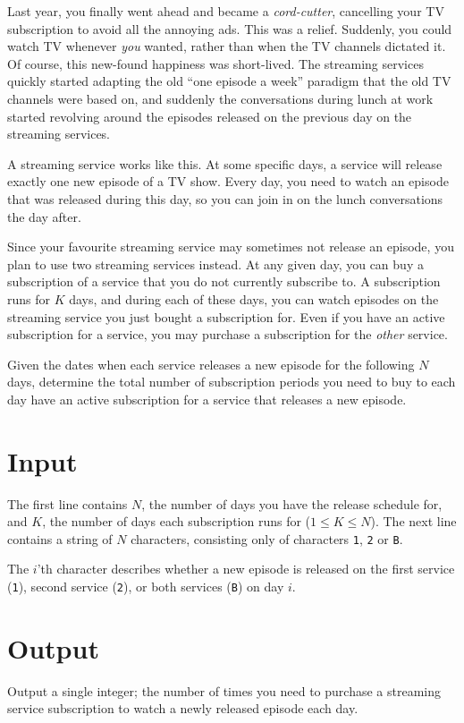 
Last year, you finally went ahead and became a \emph{cord-cutter}, cancelling your TV subscription to avoid all the annoying ads.
This was a relief.
Suddenly, you could watch TV whenever \emph{you} wanted, rather than when the TV channels dictated it.
Of course, this new-found happiness was short-lived.
The streaming services quickly started adapting the old ``one episode a week'' paradigm that the old TV channels were based on, and suddenly the conversations during lunch at work started revolving around the episodes released on the previous day on the streaming services.

A streaming service works like this.
At some specific days, a service will release exactly one new episode of a TV show.
Every day, you need to watch an episode that was released during this day, so you can join in on the lunch conversations the day after.

Since your favourite streaming service may sometimes not release an episode, you plan to use two streaming services instead.
At any given day, you can buy a subscription of a service that you do not currently subscribe to.
A subscription runs for $K$ days, and during each of these days, you can watch episodes on the streaming service you just bought a subscription for.
Even if you have an active subscription for a service, you may purchase a subscription for the \emph{other} service.

Given the dates when each service releases a new episode for the following $N$ days, determine the total number of subscription periods you need to buy to each day have an active subscription for a service that releases a new episode.

\section*{Input}
The first line contains $N$, the number of days you have the release schedule for, and $K$, the number of days each subscription runs for ($1 \le K \le N$).
The next line contains a string of $N$ characters, consisting only of characters \texttt{1}, \texttt{2} or \texttt{B}.

The $i$'th character describes whether a new episode is released on the first service (\texttt{1}), second service (\texttt{2}), or both services (\texttt{B}) on day $i$.

\section*{Output}
Output a single integer; the number of times you need to purchase a streaming service subscription to watch a newly released episode each day.

